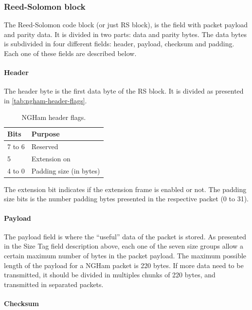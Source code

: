 \subsubsection{Reed-Solomon block}

The Reed-Solomon code block (or just RS block), is the field with packet payload and parity data. It is divided in two parts: data and parity bytes. The data bytes is subdivided in four different fields: header, payload, checksum and padding. Each one of these fields are described below.

\paragraph{Header}

The header byte is the first data byte of the RS block. It is divided as presented in \autoref{tab:ngham-header-flags}.

\begin{table}[!h]
    \centering
    \begin{tabular}{ll}
        \toprule[1.5pt]
        \textbf{Bits} & \textbf{Purpose} \\
        \midrule
        7 to 6  & Reserved \\
        5       & Extension on \\
        4 to 0  & Padding size (in bytes) \\
        \bottomrule[1.5pt]
    \end{tabular}
    \caption{NGHam header flags.}
    \label{tab:ngham-header-flags}
\end{table}

The extension bit indicates if the extension frame is enabled or not. The padding size bits is the number padding bytes presented in the respective packet (0 to 31).

\paragraph{Payload}

The payload field is where the “useful” data of the packet is stored. As presented in the Size Tag field description above, each one of the seven size groups allow a certain maximum number of bytes in the packet payload. The maximum possible length of the payload for a NGHam packet is 220 bytes. If more data need to be transmitted, it should be divided in multiples chunks of 220 bytes, and transmitted in separated packets.

\paragraph{Checksum}

